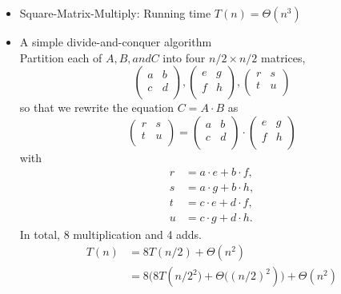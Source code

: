 \documentclass[a4paper]{article}
\theoremstyle{plain}
\begin{document}
\begin{itemize}
    \item Square-Matrix-Multiply: Running time $T(n)=\Theta (n^3)$
    \item A simple divide-and-conquer algorithm\\
    Partition each of $A, B, and C$ into four $n/2 \times n/2$ matrices,
    \begin{equation*}
        \begin{pmatrix}
      a & b \\
      c & d \\ 
  \end{pmatrix}
  ,
  \begin{pmatrix}
      e & g \\
      f & h \\ 
  \end{pmatrix}
  ,
  \begin{pmatrix}
      r & s \\
      t & u \\ 
  \end{pmatrix}
    \end{equation*}
    so that we rewrite the equation $C=A\cdot B$ as
    \begin{equation*}
        \begin{pmatrix}
      r & s \\
      t & u \\  
  \end{pmatrix}
  =
  \begin{pmatrix}
      a & b \\
      c & d \\ 
  \end{pmatrix}
  \cdot
  \begin{pmatrix}
      e & g \\
      f & h \\ 
  \end{pmatrix}
    \end{equation*}
    with
    \begin{align*}
        r&=a\cdot e + b\cdot f,\\
  s&=a\cdot g + b\cdot h,\\
  t&=c\cdot e + d\cdot f,\\
  u&=c\cdot g + d\cdot h.
    \end{align*}
    In total, 8 multiplication and 4 adds.
    \begin{align*}
        T(n) & = 8T(n/2) + \Theta(n^2) \\
  & = 8\bigl(8T(n/{2^2}\bigr) + \Theta\bigl((n/2)^2)\bigr) + \Theta(n^2) \\ 

\end{align*}
\end{itemize}
\end{document}
